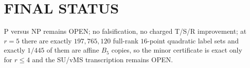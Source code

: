 \documentclass[11pt]{article}
\begin{document}
\section*{FINAL STATUS}
P versus NP remains OPEN; no falsification, no charged T/S/R improvement; at $r=5$ there are exactly $197{,}765{,}120$ full-rank $16$-point quadratic label sets and exactly $1/445$ of them are affine $B_5$ copies, so the minor certificate is exact only for $r\le4$ and the SU/vMS transcription remains OPEN.
\end{document}
